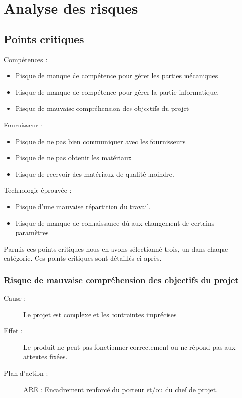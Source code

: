 \documentclass[a4paper, 12pt, leqno]{report}
\theoremstyle{plain}
\begin{document}
           \section{Analyse des risques}
            \subsection{Points critiques}
            Compétences : 
            \begin{itemize}
            \item Risque de manque de compétence pour gérer les parties mécaniques
            \item Risque de manque de compétence pour gérer la partie informatique.
            \item Risque de mauvaise compréhension des objectifs du projet
            \end{itemize}
            Fournisseur :
            \begin{itemize}
            \item Risque de ne pas bien communiquer avec les fournisseurs.
            \item Risque de ne pas obtenir les matériaux
            \item Risque de recevoir des matériaux de qualité moindre.
            \end{itemize}
            Technologie éprouvée :
            \begin{itemize}
            \item Risque d'une mauvaise répartition du travail.
            \item Risque de manque de connaissance dû aux changement de certains paramètres
            \end{itemize}
            Parmis ces points critiques nous en avons sélectionné trois, un dans chaque catégorie. Ces points critiques sont détaillés ci-après.
              \subsubsection{Risque de mauvaise compréhension des objectifs du projet}
              \begin{description}
              \item[Cause :] Le projet est complexe et les contraintes imprécises
              \item[Effet :] Le produit ne peut pas fonctionner correctement ou ne répond pas aux attentes fixées.
              \item[Plan d'action :] ARE : Encadrement renforcé du porteur et/ou du chef de projet.
              \end{description}
\end{document}
